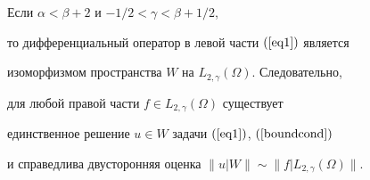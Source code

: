 \begin{thms}


Если $\alpha < \beta+2$ и $-1/2 < \gamma < \beta+1/2$, 


то дифференциальный оператор в левой части $(\ref{eq1})$ является 


изоморфизмом пространства $W$ на $L_{2,\gamma}(\Omega)$. Следовательно, 


для любой правой части $f \in L_{2,\gamma}(\Omega)$ существует 


единственное решение $u \in W$ задачи $(\ref{eq1})$, $(\ref{boundcond})$


и справедлива двусторонняя оценка $\|u|W\| \sim


\|f|L_{2,\gamma}(\Omega)\|$.


\end{thms}











